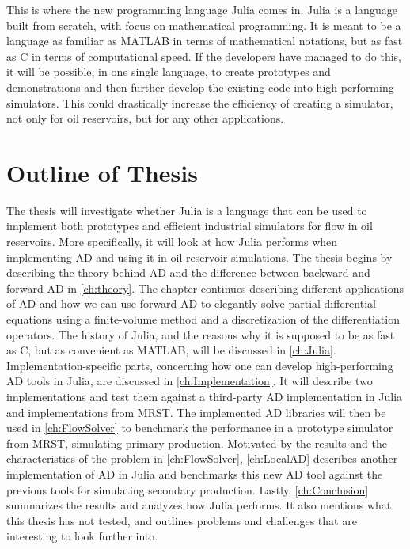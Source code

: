 This is where the new programming language Julia comes in. Julia is a language built from scratch, with focus on mathematical programming. It is meant to be a language as familiar as MATLAB in terms of mathematical notations, but as fast as C in terms of computational speed. If the developers have managed to do this, it will be possible, in one single language, to create prototypes and demonstrations and then further develop the existing code into high-performing simulators. This could drastically increase the efficiency of creating a simulator, not only for oil reservoirs, but for any other applications. 

\section{Outline of Thesis}
The thesis will investigate whether Julia is a language that can be used to implement both prototypes and efficient industrial simulators for flow in oil reservoirs. More specifically, it will look at how Julia performs when implementing AD and using it in oil reservoir simulations. The thesis begins by describing the theory behind AD and the difference between backward and forward AD in \autoref{ch:theory}. The chapter continues describing different applications of AD and how we can use forward AD to elegantly solve partial differential equations using a finite-volume method and a discretization of the differentiation operators. The history of Julia, and the reasons why it is supposed to be as fast as C, but as convenient as MATLAB, will be discussed in \autoref{ch:Julia}. Implementation-specific parts, concerning how one can develop high-performing AD tools in Julia, are discussed in \autoref{ch:Implementation}. It will describe two implementations and test them against a third-party AD implementation in Julia and implementations from MRST. The implemented AD libraries will then be used in \autoref{ch:FlowSolver} to benchmark the performance in a prototype simulator from MRST, simulating primary production. Motivated by the results and the characteristics of the problem in \autoref{ch:FlowSolver}, \autoref{ch:LocalAD} describes another implementation of AD in Julia and benchmarks this new AD tool against the previous tools for simulating secondary production. Lastly, \autoref{ch:Conclusion} summarizes the results and analyzes how Julia performs. It also mentions what this thesis has not tested, and outlines problems and challenges that are interesting to look further into.